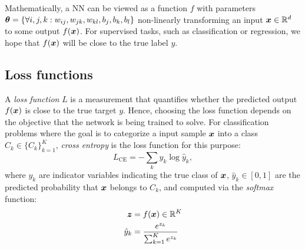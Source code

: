 %




 Mathematically, a NN can be viewed as a function $f$ with parameters $\patvector{\theta} = \{\forall i,j,k : w_{ij}, w_{jk}, w_{kl}, b_j, b_k, b_l \}$  non-linearly transforming an input $\boldsymbol{x} \in \mathbb{R}^d $ to some output $f(\boldsymbol{x})$. For supervised tasks, such as classification or regression, we hope that $f(\boldsymbol{x})$ will be close to the true label $y$.
%
%
%



\subsection{Loss functions}
A \textit{loss function} $L$  is a measurement that quantifies whether the predicted output $f(\boldsymbol{x})$ is close to the true target $y$. Hence, 
choosing the loss function depends on the objective that the network is being trained to solve. For classification problems where the goal is to categorize a input sample $\boldsymbol{x}$ into a class $C_k \in \{ C_k\}_{k=1}^K$, \textit{cross entropy} is the loss function for this purpose:
$$
L_{\text{CE}} = - \sum_{k} y_k \log \hat{y}_k,
$$
where $y_k$ are indicator variables indicating the true class of $\boldsymbol{x}$, $\hat{y}_k \in [0, 1]$ are the predicted probability that $\boldsymbol{x}$ belongs to $C_k$, and computed via the \textit{softmax} function:
\begin{align*}
\patvector{z} &= f(\x) \in \mathbb{R}^{K} \\
\hat{y}_k &= \frac{e^{z_k}}{ \sum_{k=1}^K{e^{z_k}} }
\end{align*}


